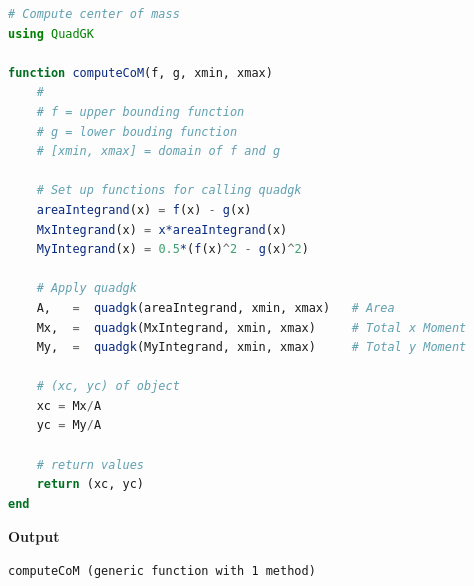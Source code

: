 \begin{figure}[htb]%
\centering
{}%
\hfill%
%

\end{figure}

\begin{lstlisting}[language=Julia,style=mystyle]
# Compute center of mass
using QuadGK

function computeCoM(f, g, xmin, xmax)
    #
    # f = upper bounding function
    # g = lower bouding function 
    # [xmin, xmax] = domain of f and g
    
    # Set up functions for calling quadgk
    areaIntegrand(x) = f(x) - g(x)
    MxIntegrand(x) = x*areaIntegrand(x)    
    MyIntegrand(x) = 0.5*(f(x)^2 - g(x)^2)
    
    # Apply quadgk  
    A,   =  quadgk(areaIntegrand, xmin, xmax)   # Area
    Mx,  =  quadgk(MxIntegrand, xmin, xmax)     # Total x Moment
    My,  =  quadgk(MyIntegrand, xmin, xmax)     # Total y Moment
    
    # (xc, yc) of object
    xc = Mx/A    
    yc = My/A
    
    # return values    
    return (xc, yc)
end
\end{lstlisting}
\textbf{Output} 
\begin{verbatim}
computeCoM (generic function with 1 method)
\end{verbatim}

